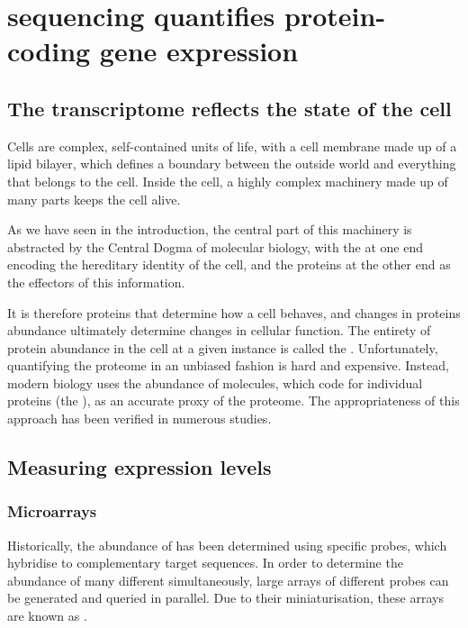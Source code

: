 \chapter{ sequencing quantifies protein-coding gene expression}

\section{The transcriptome reflects the state of the cell}

Cells are complex, self-contained units of life, with a cell membrane made up of
a lipid bilayer, which defines a boundary between the outside world and
everything that belongs to the cell. Inside the cell, a highly complex machinery
made up of many parts keeps the cell alive.

As we have seen in the introduction, the central part of this machinery is
abstracted by the Central Dogma of molecular biology, with the \dna at one end
encoding the hereditary identity of the cell, and the proteins at the other end
as the effectors of this information.

It is therefore proteins that determine how a cell behaves, and changes in
proteins abundance ultimately determine changes in cellular function. The
entirety of protein abundance in the cell at a given instance is called the
. Unfortunately, quantifying the proteome in an unbiased
fashion is hard and expensive\todo[ref]{}. Instead, modern biology uses the
abundance of \mrna molecules, which code for individual proteins (the
), as an accurate proxy of the proteome. The
appropriateness of this approach has been verified in numerous
studies\todo[ref]{}.

\section{Measuring  expression levels}


\subsection{Microarrays}

Historically, the abundance of \mrna has been determined using specific probes,
which hybridise to complementary target \mrna sequences. In order to determine
the abundance of many different \mrna[s] simultaneously, large arrays of
different probes can be generated and queried in parallel. Due to their
miniaturisation, these arrays are known as  \citep{Schena:1995}.

